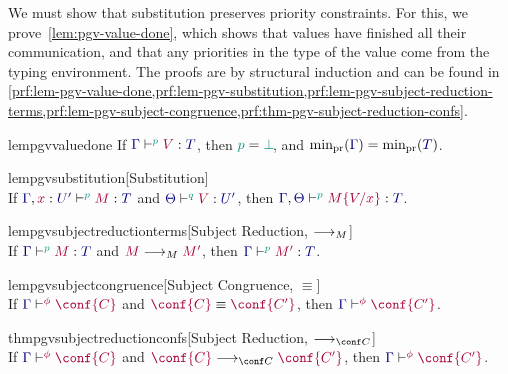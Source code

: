 \documentclass[main.tex]{subfiles}
\begin{document}
We must show that substitution preserves priority constraints. For this, we prove~\cref{lem:pgv-value-done}, which shows that values have finished all their communication, and that any priorities in the type of the value come from the typing environment. The proofs are by structural induction and can be found in \cref{prf:lem-pgv-value-done,prf:lem-pgv-substitution,prf:lem-pgv-subject-reduction-terms,prf:lem-pgv-subject-congruence,prf:thm-pgv-subject-reduction-confs}.
\begin{compacttheorems}
  \begin{restatablelemma}{lempgvvaluedone}%
    \label{lem:pgv-value-done}
    If $\tseq[\cs{p}]{\ty{\Gamma}}{V}{T}$, then $\cs{p}=\cs{\pbot}$, and $\minpr(\ty{\Gamma})=\minpr(\ty{T})$.
  \end{restatablelemma}
  \begin{restatablelemma}{lempgvsubstitution}[Substitution]%
    \label{lem:pgv-substitution}
    \hfill\\%
    If $\tseq[\cs{p}]{\ty{\Gamma},\tmty{x}{U'}}{M}{T}$ and $\tseq[\cs{q}]{\ty{\Theta}}{V}{U'}$, then $\tseq[\cs{p}]{\ty{\Gamma},\ty{\Theta}}{\subst{M}{V}{x}}{T}$.
  \end{restatablelemma}
  \begin{restatablelemma}{lempgvsubjectreductionterms}[Subject Reduction, $\longrightarrow_{M}$]%
    \label{lem:pgv-subject-reduction-terms}
    \hfill\\%
    If $\tseq[\cs{p}]{\ty{\Gamma}}{M}{T}$ and $\tm{M}\tred\tm{M'}$,
    then $\tseq[\cs{p}]{\ty{\Gamma}}{M'}{T}$.
  \end{restatablelemma}
  \begin{restatablelemma}{lempgvsubjectcongruence}[Subject Congruence, $\equiv$]%
    \label{lem:pgv-subject-congruence}
    \hfill\\%
    If $\cseq[\phi]{\ty{\Gamma}}{\conf{C}}$ and $\tm{\conf{C}}\equiv\tm{\conf{C'}}$,
    then $\cseq[\phi]{\ty{\Gamma}}{\conf{C'}}$.
  \end{restatablelemma}
  \begin{restatabletheorem}{thmpgvsubjectreductionconfs}[Subject Reduction, $\cred$]%
    \label{thm:pgv-subject-reduction-confs}
    \hfill\\%
    If $\cseq[\phi]{\ty{\Gamma}}{\conf{C}}$ and $\tm{\conf{C}}\cred\tm{\conf{C'}}$,
    then $\cseq[\phi]{\ty{\Gamma}}{\conf{C'}}$.
  \end{restatabletheorem}
\end{compacttheorems}
\end{document}
